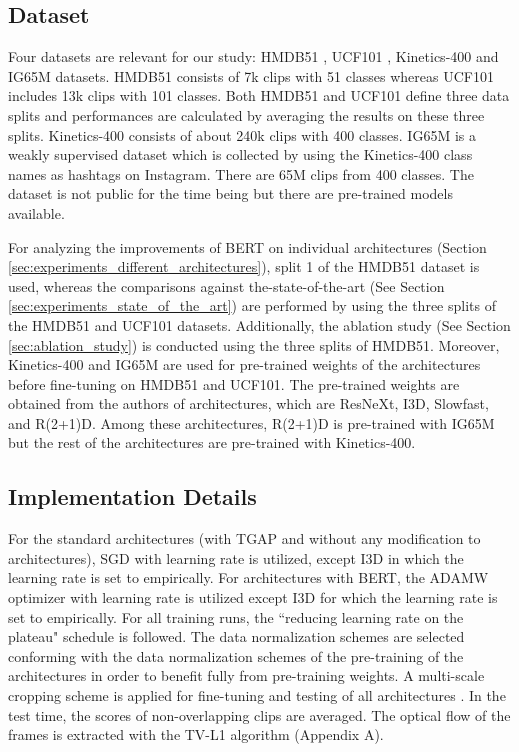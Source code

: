\documentclass[runningheads]{llncs}
\begin{document}
\subsection{Dataset}
\label{sec:dataset}

Four datasets are relevant for our study: HMDB51 \cite{Kuehne2011}, UCF101 \cite{Soomro2012}, Kinetics-400 \cite{Carreira2017} and IG65M \cite{Ghadiyaram2019Large-scaleRecognition} datasets. HMDB51 consists of 7k clips with 51 classes whereas UCF101 includes 13k clips with 101 classes. Both HMDB51 and UCF101 define three data splits and performances are calculated by averaging the results on these three splits. Kinetics-400 consists of about 240k clips with 400 classes. IG65M is a weakly supervised dataset which is collected by using the Kinetics-400 \cite{Carreira2017} class names as hashtags on Instagram. There are 65M clips from 400 classes. The dataset is not public for the time being but there are pre-trained models available. 

For analyzing the improvements of BERT on individual architectures (Section \ref{sec:experiments_different_architectures}), split 1 of the HMDB51 dataset is used, whereas the comparisons against the-state-of-the-art (See Section \ref{sec:experiments_state_of_the_art}) are performed by using the three splits of the HMDB51 and UCF101 datasets. Additionally, the ablation study (See Section \ref{sec:ablation_study}) is conducted using the three splits of HMDB51. Moreover, Kinetics-400 and IG65M are used for pre-trained weights of the architectures before fine-tuning on HMDB51 and UCF101. The pre-trained weights are obtained from the authors of architectures, which are ResNeXt, I3D, Slowfast, and R(2+1)D. Among these architectures, R(2+1)D is pre-trained with IG65M but the rest of the architectures are pre-trained with Kinetics-400.  

\subsection{Implementation Details}
For the standard architectures (with TGAP and without any modification to architectures), SGD with learning rate  is utilized, except I3D in which the learning rate is set to  empirically. For architectures with BERT, the ADAMW optimizer \cite{Loshchilov2017DecoupledRegularization} with learning rate  is utilized except I3D for which the learning rate is set to  empirically. For all training runs, the ``reducing learning rate on the plateau" schedule is followed. The data normalization schemes are selected conforming with the data normalization schemes of the pre-training of the architectures in order to benefit fully from pre-training weights. A multi-scale cropping scheme is applied for fine-tuning and testing of all architectures \cite{Wang2015}. In the test time, the scores of non-overlapping clips are averaged. The optical flow of the frames is extracted with the TV-L1 algorithm (Appendix A). 
\end{document}
